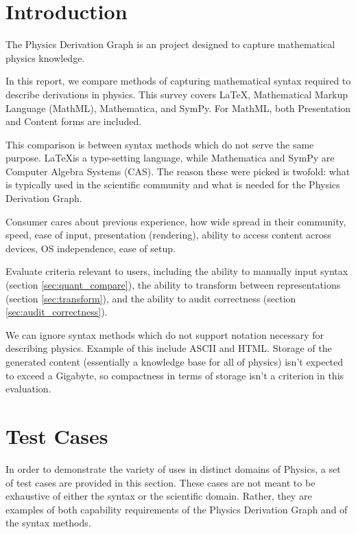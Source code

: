 \documentclass{article}
\begin{document}
\begin{multicols}{2}



\section{Introduction}

The Physics Derivation Graph is an project designed to capture mathematical physics knowledge. 


In this report, we compare methods of capturing mathematical syntax required to describe derivations in physics. This survey covers \LaTeX, Mathematical Markup Language (MathML)\cite{2014_MathML}, Mathematica\cite{2014_mathematica}, and SymPy\cite{2014_SymPy}. For MathML, both Presentation and Content forms are included.

This comparison is between syntax methods which do not serve the same purpose. \LaTeX is a type-setting language, while Mathematica and SymPy are Computer Algebra Systems (CAS). The reason these were picked is twofold: what is typically used in the scientific community and what is needed for the Physics Derivation Graph. 

Consumer cares about previous experience, how wide spread in their community, speed, ease of input, presentation (rendering), ability to access content across devices, OS independence, ease of setup. 

Evaluate criteria relevant to users, including the ability to manually input syntax (section \ref{sec:quant_compare}), the ability to transform between representations (section \ref{sec:transform}), and the ability to audit correctness (section \ref{sec:audit_correctness}).

We can ignore syntax methods which do not support notation necessary for describing physics. Example of this include ASCII\cite{1968_ASCII} and HTML\cite{1999_HTML}. Storage of the generated content (essentially a knowledge base for all of physics) isn't expected to exceed a Gigabyte, so compactness in terms of storage isn't a criterion in this evaluation.

\section{Test Cases\label{sec:test_cases}}
In order to demonstrate the variety of uses in distinct domains of Physics, a set of test cases are provided in this section. These cases are not meant to be exhaustive of either the syntax or the scientific domain. Rather, they are examples of both capability requirements of the Physics Derivation Graph and of the syntax methods. 


\end{multicols}
\end{document}
